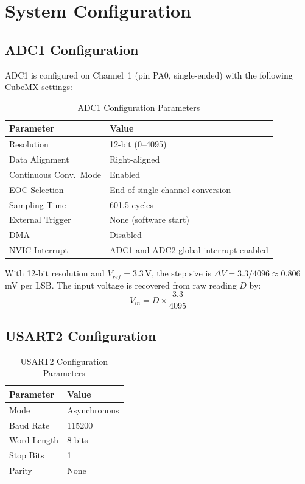 \documentclass[12pt,a4paper]{article}
\begin{document}
\section{System Configuration}

\subsection{ADC1 Configuration}

ADC1 is configured on Channel~1 (pin PA0, single-ended) with the following CubeMX settings:

\begin{table}[H]
\centering
\begin{tabular}{ll}
\toprule
\textbf{Parameter} & \textbf{Value} \\
\midrule
Resolution             & 12-bit (0--4095) \\
Data Alignment         & Right-aligned \\
Continuous Conv.\ Mode  & Enabled \\
EOC Selection          & End of single channel conversion \\
Sampling Time          & 601.5 cycles \\
External Trigger       & None (software start) \\
DMA                    & Disabled \\
NVIC Interrupt         & ADC1 and ADC2 global interrupt enabled \\
\bottomrule
\end{tabular}
\caption{ADC1 Configuration Parameters}
\end{table}

With 12-bit resolution and $V_{ref} = 3.3$\,V, the step size is $\Delta V = 3.3/4096 \approx 0.806$\,mV per LSB. The input voltage is recovered from raw reading $D$ by:
\begin{equation}
    V_{in} = D \times \frac{3.3}{4095}
\end{equation}

\subsection{USART2 Configuration}

\begin{table}[H]
\centering
\begin{tabular}{ll}
\toprule
\textbf{Parameter} & \textbf{Value} \\
\midrule
Mode            & Asynchronous \\
Baud Rate       & 115200 \\
Word Length      & 8 bits \\
Stop Bits       & 1 \\
Parity          & None \\
\bottomrule
\end{tabular}
\caption{USART2 Configuration Parameters}
\end{table}
\end{document}

